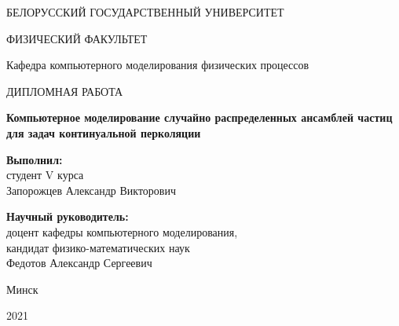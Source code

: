 \begin{titlepage}
\begin{center}
БЕЛОРУССКИЙ ГОСУДАРСТВЕННЫЙ УНИВЕРСИТЕТ

ФИЗИЧЕСКИЙ ФАКУЛЬТЕТ

Кафедра компьютерного моделирования физических процессов
\end{center}

\vspace{5cm}

\begin{center}
\LARGE {ДИПЛОМНАЯ РАБОТА}
\end{center}

\begin{center}
\LARGE \bf{Компьютерное моделирование случайно распределенных ансамблей частиц для задач континуальной перколяции}
\end{center}

\vspace{3.5cm}

\large
\begin{flushright}
\textbf{Выполнил:}\\
студент V курса\\
Запорожцев Александр Викторович\\

\vspace{1cm}

\textbf{Научный руководитель:}\\
доцент кафедры компьютерного моделирования, \\
кандидат физико-математических наук \\
Федотов Александр Сергеевич
\end{flushright}


\vspace{1cm}

\begin{center}
Минск 

2021
\end{center}

\end{titlepage}
